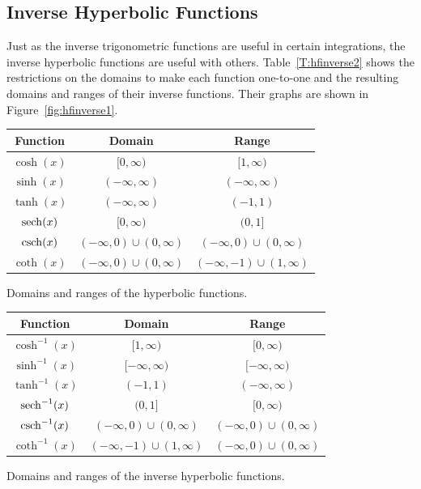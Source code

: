 

\subsection*{Inverse Hyperbolic Functions}

Just as the inverse trigonometric functions are useful in certain integrations, the inverse hyperbolic functions are useful with others. Table~\ref{T:hfinverse2} shows the restrictions on the domains to make each function one-to-one and the resulting domains and ranges of their inverse functions. Their graphs are shown in Figure~\ref{fig:hfinverse1}.

\begin{margintable}[0cm] %
\begin{tabular}{ccc}
Function & Domain & Range\\ \hline
$\cosh (x)$ & $[0,\infty)$ & $[1,\infty)$\\
$\sinh (x)$ & $(-\infty,\infty)$ & $(-\infty,\infty)$\\
$\tanh (x)$ & $(-\infty,\infty)$ & $(-1,1)$\\
$\operatorname{sech} (x)$ & $[0,\infty)$ & $(0,1]$ \\
$\operatorname{csch} (x)$ & $(-\infty,0) \cup (0,\infty)$ & $(-\infty,0) \cup (0,\infty)$\\
$\coth (x)$ & $(-\infty,0) \cup (0,\infty)$ & $(-\infty,-1) \cup (1,\infty)$
\end{tabular}
\caption{Domains and ranges of the hyperbolic functions.} \label{T:6.8_hyper1}
\end{margintable}

\begin{margintable}[0cm] %
\begin{tabular}{ccc}
Function & Domain & Range\\ \hline
\rule{0pt}{10pt}$\cosh^{-1} (x)$ & $[1,\infty)$ & $[0,\infty)$ \\
$\sinh^{-1} (x)$ & $[-\infty,\infty)$ & $[-\infty,\infty)$\\
$\tanh^{-1} (x)$ & $(-1,1)$ & $(-\infty,\infty)$\\
$\operatorname{sech}^{-1} (x)$ & $(0,1]$ & $[0,\infty)$ \\
$\operatorname{csch}^{-1} (x)$ & $(-\infty,0) \cup (0,\infty)$ & $(-\infty,0) \cup (0,\infty)$\\
$\coth^{-1} (x)$ & $(-\infty,-1) \cup (1,\infty)$ & $(-\infty,0) \cup (0,\infty)$
\end{tabular}
\caption{Domains and ranges of the inverse hyperbolic functions.}\label{T:hfinverse2}
\end{margintable}

